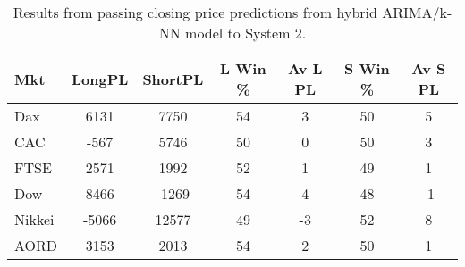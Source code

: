 \begin{table}[ht]
\centering
\caption[Results from passing closing price predictions from hybrid ARIMA/k-NN model to System 2]{Results from passing closing price predictions from hybrid ARIMA/k-NN model to System 2.} 
\label{tab:chp_ts:pred_close_arima_knn_sys2}
\begin{tabular}{lcccccc}
  \toprule Mkt & LongPL & ShortPL & L Win \% & Av L PL & S Win \% & Av S PL \\ 
  \midrule Dax & 6131 & 7750 & 54 & 3 & 50 & 5 \\ 
  CAC & -567 & 5746 & 50 & 0 & 50 & 3 \\ 
  FTSE & 2571 & 1992 & 52 & 1 & 49 & 1 \\ 
  Dow & 8466 & -1269 & 54 & 4 & 48 & -1 \\ 
  Nikkei & -5066 & 12577 & 49 & -3 & 52 & 8 \\ 
  AORD & 3153 & 2013 & 54 & 2 & 50 & 1 \\ 
   \bottomrule \end{tabular}
\end{table}
